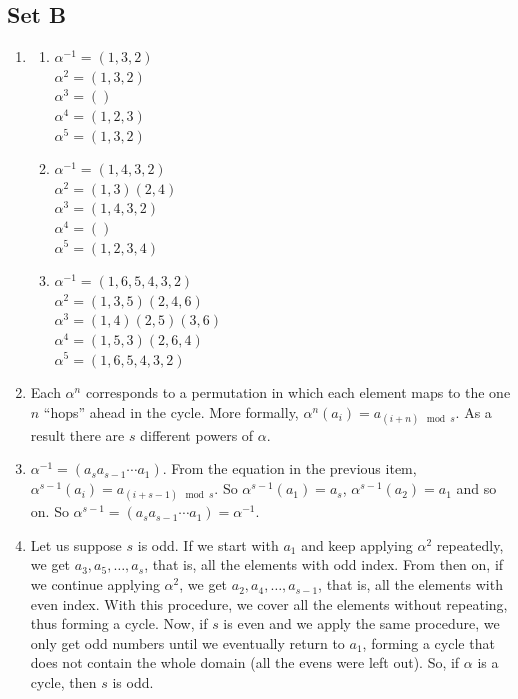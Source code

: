 \documentclass{article}
\begin{document}
\subsection{Set B}
\begin{enumerate}
    \item 
        \begin{enumerate}[label=(\alph*)]
            \item 
                $\alpha^{-1} = (1,3,2)$\\
                $\alpha^2 = (1,3,2)$\\
                $\alpha^3 = ()$\\
                $\alpha^4 = (1,2,3)$\\
                $\alpha^5 = (1,3,2)$
            
            \item 
                $\alpha^{-1} = (1,4,3,2)$\\
                $\alpha^2 = (1,3)(2,4)$\\
                $\alpha^3 = (1,4,3,2)$\\
                $\alpha^4 = ()$\\
                $\alpha^5 = (1,2,3,4)$
            
            \item
                $\alpha^{-1} = (1,6,5,4,3,2)$\\
                $\alpha^2 = (1,3,5)(2,4,6)$\\
                $\alpha^3 = (1,4)(2,5)(3,6)$\\
                $\alpha^4 = (1,5,3)(2,6,4)$\\
                $\alpha^5 = (1,6,5,4,3,2)$    
        \end{enumerate}

    \item Each $\alpha^n$ corresponds to a permutation in which each element maps to the one $n$ ``hops'' ahead in the cycle. More formally, $\alpha^n(a_i) = a_{(i + n) \mod s}$. As a result there are $s$ different powers of $\alpha$.

    \item $\alpha^{-1} = (a_sa_{s - 1}\cdots a_1)$. From the equation in the previous item, $\alpha^{s - 1}(a_i) = a_{(i + s - 1) \mod s}$. So $\alpha^{s - 1}(a_1) = a_s$, $\alpha^{s - 1}(a_2) = a_1$ and so on. So $\alpha^{s - 1} = (a_sa_{s - 1}\cdots a_1) = \alpha^{-1}$.

    \item Let us suppose $s$ is odd. If we start with $a_1$ and keep applying $\alpha^2$ repeatedly, we get $a_3, a_5, \ldots, a_s$, that is, all the elements with odd index. From then on, if we continue applying $\alpha^2$, we get $a_2, a_4, \ldots, a_{s - 1}$, that is, all the elements with even index. With this procedure, we cover all the elements without repeating, thus forming a cycle. Now, if $s$ is even and we apply the same procedure, we only get odd numbers until we eventually return to $a_1$, forming a cycle that does not contain the whole domain (all the evens were left out). So, if $\alpha$ is a cycle, then $s$ is odd.


\end{enumerate}
\end{document}
